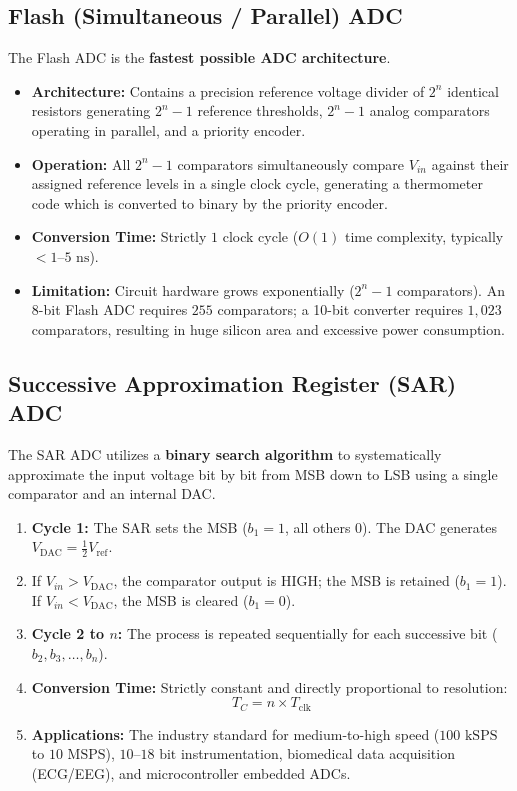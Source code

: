 \documentclass[12pt,a4paper]{article}
\begin{document}
\subsection{Flash (Simultaneous / Parallel) ADC}
The Flash ADC is the \textbf{fastest possible ADC architecture}.
\begin{itemize}[leftmargin=*, itemsep=3pt]
  \item \textbf{Architecture:} Contains a precision reference voltage divider of $2^n$ identical resistors generating $2^n - 1$ reference thresholds, $2^n - 1$ analog comparators operating in parallel, and a priority encoder.
  \item \textbf{Operation:} All $2^n - 1$ comparators simultaneously compare $V_{in}$ against their assigned reference levels in a single clock cycle, generating a thermometer code which is converted to binary by the priority encoder.
  \item \textbf{Conversion Time:} Strictly $1$ clock cycle ($O(1)$ time complexity, typically $< 1\text{--}5\text{ ns}$).
  \item \textbf{Limitation:} Circuit hardware grows exponentially ($2^n - 1$ comparators). An 8-bit Flash ADC requires $255$ comparators; a 10-bit converter requires $1{,}023$ comparators, resulting in huge silicon area and excessive power consumption.
\end{itemize}

\subsection{Successive Approximation Register (SAR) ADC}
The SAR ADC utilizes a \textbf{binary search algorithm} to systematically approximate the input voltage bit by bit from MSB down to LSB using a single comparator and an internal DAC.
\begin{enumerate}[label=\arabic*., leftmargin=*]
  \item \textbf{Cycle 1:} The SAR sets the MSB ($b_1 = 1$, all others $0$). The DAC generates $V_{\text{DAC}} = \frac{1}{2} V_{\text{ref}}$.
  \item If $V_{in} > V_{\text{DAC}}$, the comparator output is HIGH; the MSB is retained ($b_1 = 1$). If $V_{in} < V_{\text{DAC}}$, the MSB is cleared ($b_1 = 0$).
  \item \textbf{Cycle 2 to $n$:} The process is repeated sequentially for each successive bit ($b_2, b_3, \dots, b_n$).
  \item \textbf{Conversion Time:} Strictly constant and directly proportional to resolution:
  \begin{equation}
    T_C = n \times T_{\text{clk}}
  \end{equation}
  \item \textbf{Applications:} The industry standard for medium-to-high speed ($100\text{ kSPS}$ to $10\text{ MSPS}$), $10\text{--}18\text{ bit}$ instrumentation, biomedical data acquisition (ECG/EEG), and microcontroller embedded ADCs.
\end{enumerate}
\end{document}
